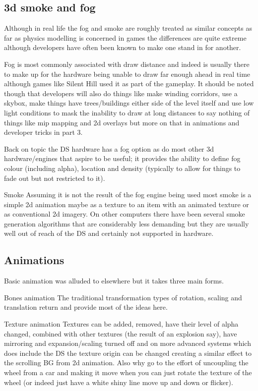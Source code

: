 \documentclass[
]{book}
\begin{document}
\hypertarget{d-smoke-and-fog}{%
\subsection{3d smoke and fog}\label{d-smoke-and-fog}}

Although in real life the fog and smoke are roughly treated as similar concepts as far as physics modelling is concerned in games the differences are quite extreme although developers have often been known to make one stand in for another.

Fog is most commonly associated with draw distance and indeed is usually there to make up for the hardware being unable to draw far enough ahead in real time although games like Silent Hill used it as part of the gameplay. It should be noted though that developers will also do things like make winding corridors, use a skybox, make things have trees/buildings either side of the level itself and use low light conditions to mask the inability to draw at long distances to say nothing of things like mip mapping and 2d overlays but more on that in animations and developer tricks in part 3.

Back on topic the DS hardware has a fog option as do most other 3d hardware/engines that aspire to be useful; it provides the ability to define fog colour (including alpha), location and density (typically to allow for things to fade out but not restricted to it).

Smoke Assuming it is not the result of the fog engine being used most smoke is a simple 2d animation maybe as a texture to an item with an animated texture or as conventional 2d imagery. On other computers there have been several smoke generation algorithms that are considerably less demanding but they are usually well out of reach of the DS and certainly not supported in hardware.

\hypertarget{animations}{%
\subsection{Animations}\label{animations}}

Basic animation was alluded to elsewhere but it takes three main forms.

Bones animation The traditional transformation types of rotation, scaling and translation return and provide most of the ideas here.

Texture animation Textures can be added, removed, have their level of alpha changed, combined with other textures (the result of an explosion say), have mirroring and expansion/scaling turned off and on more advanced systems which does include the DS the texture origin can be changed creating a similar effect to the scrolling BG from 2d animation. Also why go to the effort of uncoupling the wheel from a car and making it move when you can just rotate the texture of the wheel (or indeed just have a white shiny line move up and down or flicker).
\end{document}
